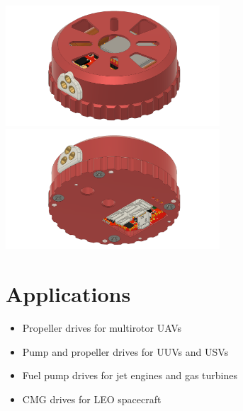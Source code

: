 \documentclass{zubaxdoc}
\begin{document}
\begin{titlepage}
\centering
\includegraphics[width=0.6\textwidth]{top_view.png}
\includegraphics[width=0.6\textwidth]{bottom_view.png}

\section*{Applications}

\begin{itemize}
    \item Propeller drives for multirotor UAVs
    \item Pump and propeller drives for UUVs and USVs
    \item Fuel pump drives for jet engines and gas turbines
    \item CMG drives for LEO spacecraft
\end{itemize}

\end{titlepage}

\tableofcontents
\BeginRightColumn
\listoffigures
\listoftables

\mainmatter







\end{document}
